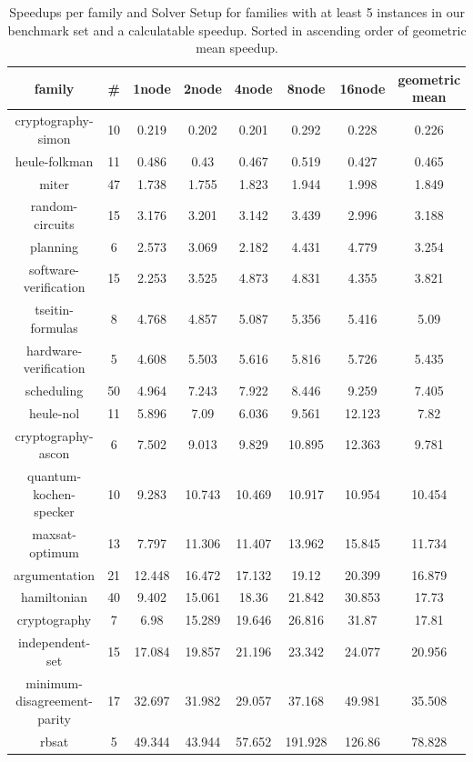 \documentclass[12pt,a4paper,twoside]{scrartcl}
\numberwithin{equation}{section}
\begin{document}
\begin{table}
  \center
  \begin{tabular}{ cccccccc }
    \toprule
    family	&	\#	&	1node	&	2node	&	4node	&	8node	&	16node	&	geometric mean\\
    \midrule
    cryptography-simon	&	10	&	0.219	&	0.202	&	0.201	&	0.292	&	0.228	&	0.226\\
    heule-folkman	&	11	&	0.486	&	0.43	&	0.467	&	0.519	&	0.427	&	0.465\\
    miter	&	47	&	1.738	&	1.755	&	1.823	&	1.944	&	1.998	&	1.849\\
    random-circuits	&	15	&	3.176	&	3.201	&	3.142	&	3.439	&	2.996	&	3.188\\
    planning	&	6	&	2.573	&	3.069	&	2.182	&	4.431	&	4.779	&	3.254\\
    software-verification	&	15	&	2.253	&	3.525	&	4.873	&	4.831	&	4.355	&	3.821\\
    tseitin-formulas	&	8	&	4.768	&	4.857	&	5.087	&	5.356	&	5.416	&	5.09\\
    hardware-verification	&	5	&	4.608	&	5.503	&	5.616	&	5.816	&	5.726	&	5.435\\
    scheduling	&	50	&	4.964	&	7.243	&	7.922	&	8.446	&	9.259	&	7.405\\
    heule-nol	&	11	&	5.896	&	7.09	&	6.036	&	9.561	&	12.123	&	7.82\\
    cryptography-ascon	&	6	&	7.502	&	9.013	&	9.829	&	10.895	&	12.363	&	9.781\\
    quantum-kochen-specker	&	10	&	9.283	&	10.743	&	10.469	&	10.917	&	10.954	&	10.454\\
    maxsat-optimum	&	13	&	7.797	&	11.306	&	11.407	&	13.962	&	15.845	&	11.734\\
    argumentation	&	21	&	12.448	&	16.472	&	17.132	&	19.12	&	20.399	&	16.879\\
    hamiltonian	&	40	&	9.402	&	15.061	&	18.36	&	21.842	&	30.853	&	17.73\\
    cryptography	&	7	&	6.98	&	15.289	&	19.646	&	26.816	&	31.87	&	17.81\\
    independent-set	&	15	&	17.084	&	19.857	&	21.196	&	23.342	&	24.077	&	20.956\\
    minimum-disagreement-parity	&	17	&	32.697	&	31.982	&	29.057	&	37.168	&	49.981	&	35.508\\
    rbsat	&	5	&	49.344	&	43.944	&	57.652	&	191.928	&	126.86	&	78.828\\
    \bottomrule
  \end{tabular}
  \caption{Speedups per family and Solver Setup for families with at least 5 instances in our benchmark set and a calculatable speedup. Sorted in ascending order of geometric mean speedup.}
  \label{tab:speedupsSignificantFamilies}
\end{table}
\end{document}
